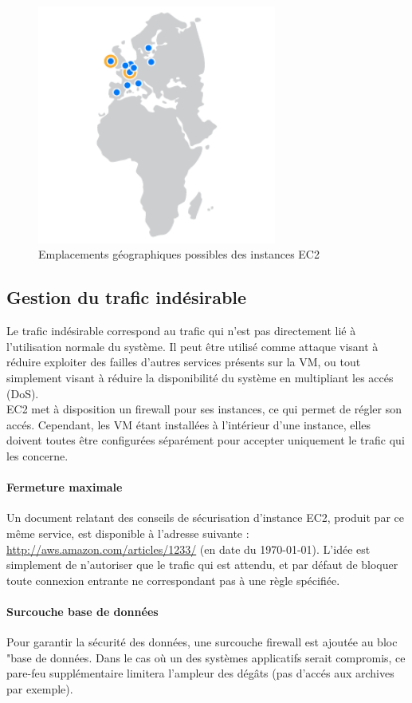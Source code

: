 \begin{figure}[h]
    \centering
    \includegraphics[width=0.7\textwidth]{aws-europe}
    \caption{Emplacements géographiques possibles des instances EC2}
    \label{fig:aws-europe}
\end{figure}

\subsection{Gestion du trafic indésirable}
\label{subsec:gestion-trafic-indesirable}

Le trafic indésirable correspond au trafic qui n'est pas directement lié à
l'utilisation normale du système. Il peut être utilisé comme attaque visant à
réduire exploiter des failles d'autres services présents sur la VM, ou tout
simplement visant à réduire la disponibilité du système en multipliant les
accés (DoS). \\

EC2 met à disposition un firewall pour ses instances, ce qui permet de régler
son accés. Cependant, les VM étant installées à l'intérieur d'une instance,
elles doivent toutes être configurées séparément pour accepter uniquement le
trafic qui les concerne.

\paragraph{Fermeture maximale}

Un document relatant des conseils de sécurisation d'instance EC2, produit par
ce même service, est disponible à l'adresse suivante :
\url{http://aws.amazon.com/articles/1233/} (en date du \today). L'idée est
simplement de n'autoriser que le trafic qui est attendu, et par défaut de
bloquer toute connexion entrante ne correspondant pas à une règle spécifiée.

\paragraph{Surcouche base de données}

Pour garantir la sécurité des données, une surcouche firewall est ajoutée au
bloc "base de données. Dans le cas où un des systèmes applicatifs serait
compromis, ce pare-feu supplémentaire limitera l'ampleur des dégâts (pas
d'accés aux archives par exemple).


